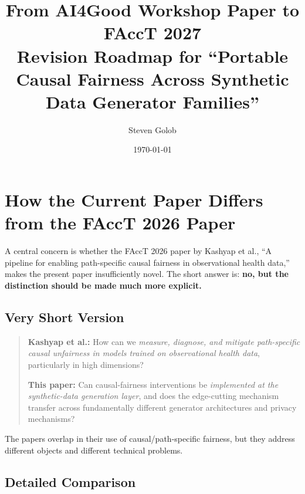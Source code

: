 \documentclass[11pt]{article}
\title{From AI4Good Workshop Paper to FAccT 2027\\
\large Revision Roadmap for ``Portable Causal Fairness Across Synthetic Data Generator Families''}
\author{Steven Golob}
\date{\today}
\begin{document}
\maketitle


\section*{How the Current Paper Differs from the FAccT 2026 Paper}

A central concern is whether the FAccT 2026 paper by Kashyap et al., ``A pipeline for enabling path-specific causal fairness in observational health data,'' makes the present paper insufficiently novel. The short answer is: \textbf{no, but the distinction should be made much more explicit.}

\subsection{Very Short Version}

\begin{quote}
\textbf{Kashyap et al.:} How can we \emph{measure, diagnose, and mitigate path-specific causal unfairness in models trained on observational health data}, particularly in high dimensions?

\textbf{This paper:} Can causal-fairness interventions be \emph{implemented at the synthetic-data generation layer}, and does the edge-cutting mechanism transfer across fundamentally different generator architectures and privacy mechanisms?
\end{quote}

The papers overlap in their use of causal/path-specific fairness, but they address different objects and different technical problems.

\subsection{Detailed Comparison}
\end{document}
